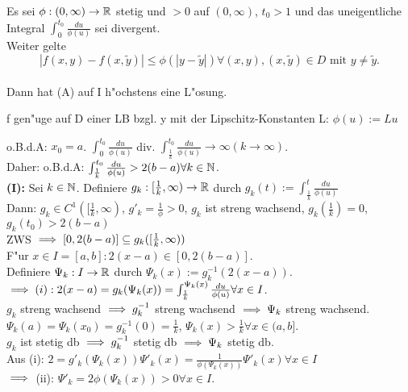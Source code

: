 \documentclass[a4paper,twoside,DIV15,BCOR12mm]{scrbook}
\begin{document}
\begin{satz}
Es sei $\phi:(0,\infty)\to\mathbb{R}$ stetig und $>0$ auf $(0,\infty)$, $t_0>1$ und das uneigentliche Integral $\int_0^{t_0}\frac{du}{\phi(u)}$ sei divergent.\\
Weiter gelte \[|f(x,y)-f(x,\tilde y)|\le\phi(|y-\tilde y|) \forall (x,y),(x,\tilde y) \in D\text{ mit } y\ne \tilde y.\] \\
Dann hat (A) auf I h"ochstens eine L"osung.
\end{satz}
\begin{bemerkung}
f gen"uge auf D einer LB bzgl. y mit der Lipschitz-Konstanten L: $\phi(u):=Lu$
\end{bemerkung}
\begin{beweis}
o.B.d.A: $x_0=a$. $\int_0^{t_0}\frac{du}{\phi(u)}$ div. \folgt  $\int_{\frac{1}{k}}^{t_0}\frac{du}{\phi(u)}\to\infty(k\to\infty)$.\\
Daher: o.B.d.A:   $\int_{\frac{1}{k}}^{t_0}\frac{du}{\phi(u)} > 2(b-a)\forall k\in\mathbb{N}$.\\

\textbf{(I):} Sei $k\in\mathbb{N}$. Definiere $g_k:[\frac{1}{k},\infty)\to\mathbb{R}$ durch $g_k(t):= \int_{\frac{1}{k}}^{t}\frac{du}{\phi(u)}$\\
Dann: $g_k \in C^1([\frac{1}{k},\infty)$, $g'_k=\frac{1}{\phi}>0$, $g_k$ ist streng wachsend, $g_k(\frac{1}{k})=0$, $g_k(t_0)>2(b-a)$\\
ZWS $\implies [0,2(b-a)] \subseteq g_k([\frac{1}{k},\infty))$\\
F"ur $x \in I = [a,b]:2(x-a) \in [0,2(b-a)]$.\\ Definiere $\Psi_k:I\to\mathbb{R}$ durch $\Psi_k(x):=g_k^{-1}(2(x-a))$.\\
$\implies (i): 2(x-a) = g_k(\Psi_k(x)) = \int_{\frac{1}{k}}^{\Psi_k(x)}\frac{du}{\phi(u)} \forall x \in I$.\\
$g_k$ streng wachsend $\implies g_k^{-1}$ streng wachsend $\implies \Psi_k$ streng wachsend.\\
$\Psi_k(a)=\Psi_k(x_0)=g_k^{-1}(0)=\frac{1}{k}$, $\Psi_k(x)>\frac{1}{k}\forall x \in (a,b]$.\\
$g_k$ ist stetig db $\implies g_k^{-1}$ stetig db $\implies \Psi_k$ stetig db.\\
Aus (i): $2 =g'_k(\Psi_k(x))\Psi'_k(x) = \frac{1}{\phi(\Psi_k(x))}\Psi'_k(x)\forall x \in I$\\
$\implies$ (ii): $\Psi'_k=2\phi(\Psi_k(x))>0\forall x \in I$.\\


\end{beweis}
\end{document}
